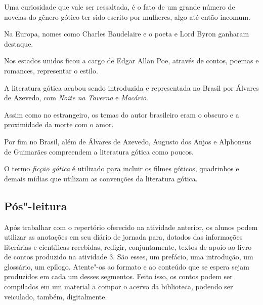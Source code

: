 \documentclass[12pt]{extarticle}
\begin{document}


Uma curiosidade que vale ser ressaltada, é o fato de um grande número de
novelas do gênero gótico ter sido escrito por mulheres, algo até então
incomum.

Na Europa, nomes como Charles Baudelaire e o poeta e Lord Byron ganharam
destaque.

Nos estados unidos ficou a cargo de Edgar Allan Poe, através de contos,
poemas e romances, representar o estilo.

A literatura gótica acabou sendo introduzida e representada no Brasil
por Álvares de Azevedo, com \emph{Noite na Taverna} e \emph{Macário}.


Assim como no estrangeiro, os temas do autor brasileiro eram o obscuro e
a proximidade da morte com o amor.~

Por fim no Brasil, além de Álvares de Azevedo, Augusto dos Anjos e
Alphonsus de Guimarães compreendem a literatura gótica como poucos.



O termo \emph{ficção gótica} é utilizado para incluir os filmes góticos,
quadrinhos e demais mídias que utilizam as convenções da literatura
gótica.

\subsection{Pós"-leitura}

Após trabalhar com o repertório oferecido na atividade
anterior, os alunos podem utilizar as anotações em seu diário de jornada
para, dotados das informações literárias e científicas recebidas,
redigir, conjuntamente, textos de apoio ao livro de contos produzido na
atividade 3. São esses, um prefácio, uma introdução, um glossário, um
epílogo. Atente"-os ao formato e ao conteúdo que se espera sejam
produzidos em cada um desses segmentos. Feito isso, os contos podem ser
compilados em um material a compor o acervo da biblioteca, podendo ser
veiculado, também, digitalmente.
\end{document}
